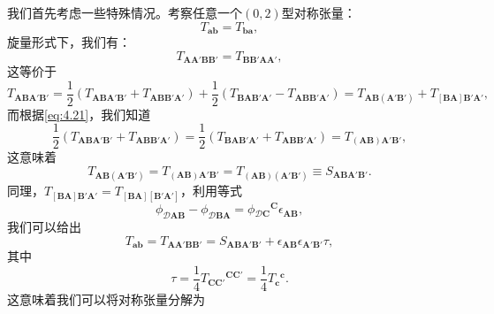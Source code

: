 我们首先考虑一些特殊情况。考察任意一个$( 0,2)$型对称张量：
\begin{equation*}
	T_{\boldsymbol{ab}} =T_{\boldsymbol{ba}} ,
\end{equation*}
旋量形式下，我们有：
\begin{equation}
	T_{\boldsymbol{AA} '\boldsymbol{BB} '} =T_{\boldsymbol{BB} '\boldsymbol{AA} '} ,
	\label{eq:4.21}
\end{equation}
这等价于
\begin{equation*}
	T_{\boldsymbol{ABA} '\boldsymbol{B} '} =\frac{1}{2}( T_{\boldsymbol{ABA} '\boldsymbol{B} '} +T_{\boldsymbol{ABB} '\boldsymbol{A} '}) +\frac{1}{2}( T_{\boldsymbol{BAB} '\boldsymbol{A} '} -T_{\boldsymbol{ABB} '\boldsymbol{A} '}) =T_{\boldsymbol{AB}(\boldsymbol{A} '\boldsymbol{B} ')} +T_{[\boldsymbol{BA}]\boldsymbol{B} '\boldsymbol{A} '} ,
\end{equation*}
而根据\ref{eq:4.21}，我们知道
\begin{equation*}
	\frac{1}{2}( T_{\boldsymbol{ABA} '\boldsymbol{B} '} +T_{\boldsymbol{ABB} '\boldsymbol{A} '}) =\frac{1}{2}( T_{\boldsymbol{BAB} '\boldsymbol{A} '} +T_{\boldsymbol{ABB} '\boldsymbol{A} '}) =T_{(\boldsymbol{AB})\boldsymbol{A} '\boldsymbol{B} '} ,
\end{equation*}
这意味着
\begin{equation*}
	T_{\boldsymbol{AB}(\boldsymbol{A} '\boldsymbol{B} ')} =T_{(\boldsymbol{AB})\boldsymbol{A} '\boldsymbol{B} '} =T_{(\boldsymbol{AB})(\boldsymbol{A} '\boldsymbol{B} ')} \equiv S_{\boldsymbol{ABA} '\boldsymbol{B} '} .
\end{equation*}
同理，$T_{[\boldsymbol{BA}]\boldsymbol{B} '\boldsymbol{A} '} =T_{[\boldsymbol{BA}][\boldsymbol{B} '\boldsymbol{A} ']}$，利用等式
\begin{equation*}
	\phi _{\mathcal{D}\boldsymbol{AB}} -\phi _{\mathcal{D}\boldsymbol{BA}} =\phi {_{\mathcal{D}\boldsymbol{C}}}^{\boldsymbol{C}} \epsilon _{\boldsymbol{AB}} ,
\end{equation*}
我们可以给出
\begin{equation*}
	T_{\boldsymbol{ab}} =T_{\boldsymbol{AA} '\boldsymbol{BB} '} =S_{\boldsymbol{ABA} '\boldsymbol{B} '} +\epsilon _{\boldsymbol{AB}} \epsilon _{\boldsymbol{A} '\boldsymbol{B} '} \tau ,
\end{equation*}
其中
\begin{equation*}
	\tau =\frac{1}{4} T{_{\boldsymbol{CC} '}}^{\boldsymbol{CC} '} =\frac{1}{4} T{_{\boldsymbol{c}}}^{\boldsymbol{c}} .
\end{equation*}
这意味着我们可以将对称张量分解为
